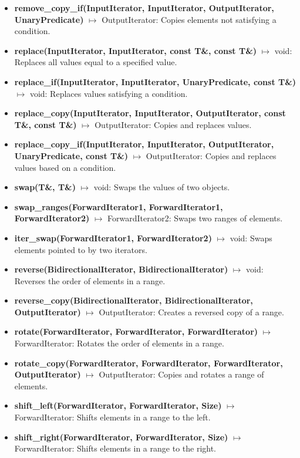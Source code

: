 \documentclass{report}
\begin{document}
\begin{itemize}
    \item \textbf{remove\_copy\_if(InputIterator, InputIterator, OutputIterator, UnaryPredicate)} \(\mapsto\) OutputIterator: Copies elements not satisfying a condition.
    \item \textbf{replace(InputIterator, InputIterator, const T\&, const T\&)} \(\mapsto\) void: Replaces all values equal to a specified value.
    \item \textbf{replace\_if(InputIterator, InputIterator, UnaryPredicate, const T\&)} \(\mapsto\) void: Replaces values satisfying a condition.
    \item \textbf{replace\_copy(InputIterator, InputIterator, OutputIterator, const T\&, const T\&)} \(\mapsto\) OutputIterator: Copies and replaces values.
    \item \textbf{replace\_copy\_if(InputIterator, InputIterator, OutputIterator, UnaryPredicate, const T\&)} \(\mapsto\) OutputIterator: Copies and replaces values based on a condition.
    \item \textbf{swap(T\&, T\&)} \(\mapsto\) void: Swaps the values of two objects.
    \item \textbf{swap\_ranges(ForwardIterator1, ForwardIterator1, ForwardIterator2)} \(\mapsto\) ForwardIterator2: Swaps two ranges of elements.
    \item \textbf{iter\_swap(ForwardIterator1, ForwardIterator2)} \(\mapsto\) void: Swaps elements pointed to by two iterators.
    \item \textbf{reverse(BidirectionalIterator, BidirectionalIterator)} \(\mapsto\) void: Reverses the order of elements in a range.
    \item \textbf{reverse\_copy(BidirectionalIterator, BidirectionalIterator, OutputIterator)} \(\mapsto\) OutputIterator: Creates a reversed copy of a range.
    \item \textbf{rotate(ForwardIterator, ForwardIterator, ForwardIterator)} \(\mapsto\) ForwardIterator: Rotates the order of elements in a range.
    \item \textbf{rotate\_copy(ForwardIterator, ForwardIterator, ForwardIterator, OutputIterator)} \(\mapsto\) OutputIterator: Copies and rotates a range of elements.
    \item \textbf{shift\_left(ForwardIterator, ForwardIterator, Size)} \(\mapsto\) ForwardIterator: Shifts elements in a range to the left.
    \item \textbf{shift\_right(ForwardIterator, ForwardIterator, Size)} \(\mapsto\) ForwardIterator: Shifts elements in a range to the right.

\end{itemize}
\end{document}
